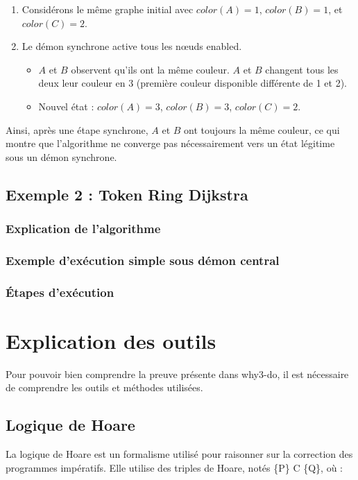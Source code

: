 \documentclass[11pt]{article}
\begin{document}
\begin{enumerate}
\item Considérons le même graphe initial avec \(color(A) = 1\), \(color(B) = 1\), et \(color(C) = 2\).

\item Le démon synchrone active tous les nœuds enabled.
\begin{itemize}
\item \(A\) et \(B\) observent qu'ils ont la même couleur. \(A\) et \(B\) changent tous les deux leur couleur en 3 (première couleur disponible différente de 1 et 2).
\item Nouvel état : \(color(A) = 3\), \(color(B) = 3\), \(color(C) = 2\).
\end{itemize}
\end{enumerate}

Ainsi, après une étape synchrone, \(A\) et \(B\) ont toujours la même couleur, ce qui montre que l'algorithme ne converge pas nécessairement vers un état légitime sous un démon synchrone.


\subsection{Exemple 2 : Token Ring Dijkstra}
\label{sec:orge0cef2d}
\subsubsection{Explication de l'algorithme}
\label{sec:orga9468d3}

\subsubsection{Exemple d'exécution simple sous démon central}
\label{sec:orga2ac803}

\subsubsection{Étapes d'exécution}
\label{sec:org38664fd}


\section{Explication des outils}
\label{sec:orgf195ee0}
Pour pouvoir bien comprendre la preuve présente dans why3-do, il est nécessaire de comprendre les outils et méthodes utilisées.

\subsection{Logique de Hoare}
\label{sec:org43f3797}
La logique de Hoare est un formalisme utilisé pour raisonner sur la correction des programmes impératifs. Elle utilise des triples de Hoare, notés \{P\} C \{Q\}, où :
\end{document}
